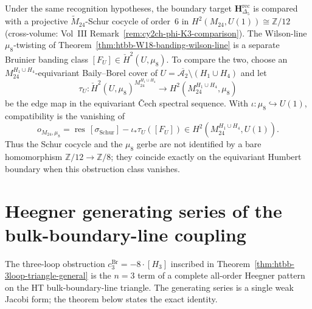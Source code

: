 \begin{remark}
\label{rem:htbb-mu8-schur-cocycle}
Under the same recognition hypotheses, the boundary target
$\mathbf{H}_{\Delta_5}^{\mathrm{rec}}$ is compared with a projective
$\widetilde{M}_{24}$-Schur cocycle of order~$6$ in
$H^2(M_{24},U(1))\cong\mathbb Z/12$ \textup{(}cross-volume: Vol~III
Remark~\ref{rem:cy2ch-phi-K3-comparison}\textup{).} The Wilson-line
$\mu_8$-twisting of Theorem~\ref{thm:htbb-W18-banding-wilson-line} is a
separate Bruinier banding class
$[F_U]\in \check H^2(U,\mu_8)$. To compare the two, choose an
$M_{24}^{H_1\cup H_4}$-equivariant Baily--Borel cover of
$U=\overline{\mathcal A_2}\setminus(H_1\cup H_4)$ and let
\[
 \tau_U:\check H^2(U,\mu_8)^{M_{24}^{H_1\cup H_4}}
 \longrightarrow H^2(M_{24}^{H_1\cup H_4},\mu_8)
\]
be the edge map in the equivariant \v Cech spectral sequence. With
$\iota:\mu_8\hookrightarrow U(1)$, compatibility is the vanishing of
\[
 o_{M_{24},\mu_8}
 =
 \operatorname{res}\,[\sigma_{\mathrm{Schur}}]
 -
 \iota_\ast\tau_U([F_U])
 \in H^2(M_{24}^{H_1\cup H_4},U(1)).
\]
Thus the Schur cocycle and the $\mu_8$ gerbe are not identified by a
bare homomorphism $\mathbb Z/12\to\mathbb Z/8$; they coincide exactly
on the equivariant Humbert boundary when this obstruction class
vanishes.
\end{remark}

\section{Heegner generating series of the bulk-boundary-line coupling}
\label{sec:htbb-heegner-generating-series}

The three-loop obstruction $c^{\mathrm{Br}}_3 = -8\cdot[H_3]$ inscribed in
Theorem~\ref{thm:htbb-3loop-triangle-general} is the
$n = 3$ term of a complete all-order Heegner pattern on the HT
bulk-boundary-line triangle. The generating series is a single weak
Jacobi form; the theorem below states the exact identity.

